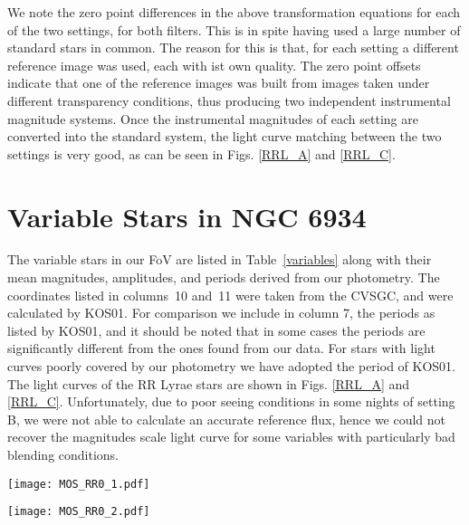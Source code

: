 \documentclass[journal]{rmaa}
\newcommand{\1}{\'{\i}}
\begin{document}
We note the zero point differences in the above transformation equations for each of
the two settings, for both filters. This is in spite having used a large number of
standard stars in common. The reason for this is that, for each setting a different
reference image was used, each with ist own quality. The zero point offsets indicate
that one of the reference images was built from images taken under different
transparency conditions, thus producing two
independent instrumental magnitude systems. Once the instrumental magnitudes of
each setting are converted into the standard system, the light curve matching between
the two settings is very good, as can be seen in Figs. \ref{RRL_A} and \ref{RRL_C}.

\section{Variable Stars in NGC 6934}

The variable stars in our FoV are listed in Table~\ref {variables}
along with their
mean magnitudes, amplitudes, and periods derived from our photometry. The coordinates
listed in columns~10 and~11 were taken from the CVSGC, and were calculated by KOS01.
For comparison we include in column 7, the periods as listed by KOS01, and it should
be noted that in some cases the periods are significantly different from the ones
found from our data. For stars with light curves poorly covered by our photometry we
have adopted the period of KOS01. The light curves of the RR Lyrae stars are shown in
Figs. \ref{RRL_A} and \ref{RRL_C}. Unfortunately, due to poor seeing conditions in
some nights of setting B, we were not able to calculate an accurate reference flux,
hence we could not recover the magnitudes scale light curve for some variables
with particularly bad blending conditions.


\begin{figure*}
\texttt{[image: MOS\_RR0\_1.pdf]}
\caption{Light curves of the RRab stars in our FoV
phased with the periods listed in Table~\ref{variables}. In order to appreciate the
amplitude differences from star to star, the vertical axis displays $V-<V>$ and
$I-<I>$. The intensity-weighted means are listed in Table \ref{variables}. Blue
symbols correspond to data from setting A and black to data from setting B. See text
in the Appendix A for discussion of some individual stars.}
    \label{RRL_A}
\end{figure*}

\begin{figure*}
\texttt{[image: MOS\_RR0\_2.pdf]}
\caption{Continued}
\end{figure*}
\end{document}
